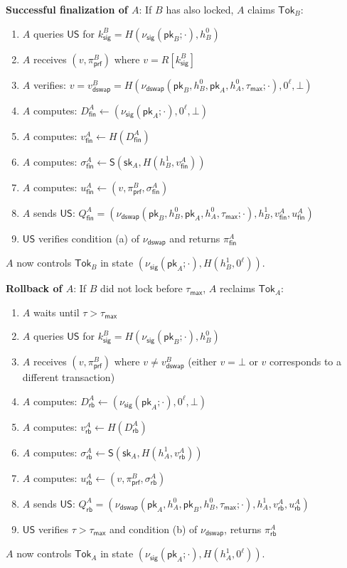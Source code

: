 \documentclass{article}
\newcommand{\sig}[0]{\mathsf{S}}
\newcommand{\pubkey}[0]{\mathsf{pk}}
\newcommand{\prikey}[0]{\mathsf{sk}}
\newcommand{\unisrv}[0]{\mathsf{US}}
\begin{document}
\noindent\textbf{Successful finalization of $A$}: If $B$ has also locked, $A$ claims $\mathsf{Tok}_B$:
\begin{enumerate}
\item $A$ queries $\unisrv$ for $k^B_\mathsf{sig} = H(\nu_\mathsf{sig}(\pubkey_B;\cdot), h^0_B)$
\item $A$ receives $(v, \pi^B_\mathsf{prf})$ where $v = R[k^B_\mathsf{sig}]$
\item $A$ verifies: $v = v^B_\mathsf{dswap} = H(\nu_\mathsf{dswap}(\pubkey_B, h^0_B, \pubkey_A, h^0_A, \tau_\mathsf{max};\cdot), 0^\ell, \bot)$
\item $A$ computes: $D^A_\mathsf{fin} \gets (\nu_\mathsf{sig}(\pubkey_A;\cdot), 0^\ell, \bot)$
\item $A$ computes: $v^A_\mathsf{fin} \gets H(D^A_\mathsf{fin})$
\item $A$ computes: $\sigma^A_\mathsf{fin} \gets \sig(\prikey_A, H(h^1_B, v^A_\mathsf{fin}))$
\item $A$ computes: $u^A_\mathsf{fin} \gets (v, \pi^B_\mathsf{prf}, \sigma^A_\mathsf{fin})$
\item $A$ sends $\unisrv$: $Q^A_\mathsf{fin} = (\nu_\mathsf{dswap}(\pubkey_B, h^0_B, \pubkey_A, h^0_A, \tau_\mathsf{max};\cdot), h^1_B, v^A_\mathsf{fin}, u^A_\mathsf{fin})$
\item $\unisrv$ verifies condition (a) of $\nu_\mathsf{dswap}$ and returns $\pi^A_\mathsf{fin}$
\end{enumerate}
$A$ now controls $\mathsf{Tok}_B$ in state $(\nu_\mathsf{sig}(\pubkey_A;\cdot), H(h^1_B, 0^\ell))$.\medskip

\noindent\textbf{Rollback of $A$}: If $B$ did not lock before $\tau_\mathsf{max}$, $A$ reclaims $\mathsf{Tok}_A$:
\begin{enumerate}
\item $A$ waits until $\tau > \tau_\mathsf{max}$
\item $A$ queries $\unisrv$ for $k^B_\mathsf{sig} = H(\nu_\mathsf{sig}(\pubkey_B;\cdot), h^0_B)$
\item $A$ receives $(v, \pi^B_\mathsf{prf})$ where $v \neq v^B_\mathsf{dswap}$ (either $v = \bot$ or $v$ corresponds to a different transaction)
\item $A$ computes: $D^A_\mathsf{rb} \gets (\nu_\mathsf{sig}(\pubkey_A;\cdot), 0^\ell, \bot)$
\item $A$ computes: $v^A_\mathsf{rb} \gets H(D^A_\mathsf{rb})$
\item $A$ computes: $\sigma^A_\mathsf{rb} \gets \sig(\prikey_A, H(h^1_A, v^A_\mathsf{rb}))$
\item $A$ computes: $u^A_\mathsf{rb} \gets (v, \pi^B_\mathsf{prf}, \sigma^A_\mathsf{rb})$
\item $A$ sends $\unisrv$: $Q^A_\mathsf{rb} = (\nu_\mathsf{dswap}(\pubkey_A, h^0_A, \pubkey_B, h^0_B, \tau_\mathsf{max};\cdot), h^1_A, v^A_\mathsf{rb}, u^A_\mathsf{rb})$
\item $\unisrv$ verifies $\tau > \tau_\mathsf{max}$ and condition (b) of $\nu_\mathsf{dswap}$, returns $\pi^A_\mathsf{rb}$
\end{enumerate}
$A$ now controls $\mathsf{Tok}_A$ in state $(\nu_\mathsf{sig}(\pubkey_A;\cdot), H(h^1_A, 0^\ell))$.
\end{document}
